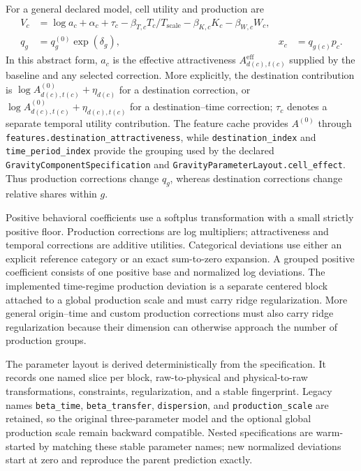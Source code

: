 For a general declared model, cell utility and production are
\[
\begin{aligned}
 V_c & = \log a_c + \alpha_c + \tau_c
       -\beta_{T,c}T_c/T_{\mathrm{scale}}
       -\beta_{K,c}K_c-\beta_{W,c}W_c,\\
 q_g & =q_g^{(0)}\exp(\delta_g),
 & x_c & =q_{g(c)}p_c.
\end{aligned}
\]
In this abstract form, $a_c$ is the effective attractiveness
$A^{\mathrm{eff}}_{d(c),t(c)}$ supplied by the baseline and any selected
correction.  More explicitly, the destination contribution is
$\log A^{(0)}_{d(c),t(c)}+\eta_{d(c)}$ for a destination correction, or
$\log A^{(0)}_{d(c),t(c)}+\eta_{d(c),t(c)}$ for a destination--time correction;
$\tau_c$ denotes a separate temporal utility contribution.  The feature cache
provides $A^{(0)}$ through
\texttt{features.destination\_attractiveness}, while
\texttt{destination\_index} and \texttt{time\_period\_index} provide the
grouping used by the declared
\texttt{GravityComponent\allowbreak{}Specification} and
\texttt{GravityParameter\allowbreak{}Layout.cell\_effect}.  Thus production corrections
change $q_g$, whereas destination corrections change relative shares within
$g$.

Positive behavioral coefficients use a softplus transformation with a small
strictly positive floor. Production corrections are log multipliers;
attractiveness and temporal corrections are additive utilities. Categorical
deviations use either an explicit reference category or an exact sum-to-zero
expansion. A grouped positive coefficient consists of one positive base and
normalized log deviations. The implemented time-regime production deviation
is a separate centered block attached to a global production scale and must
carry ridge regularization. More general origin--time and custom production
corrections must also carry ridge regularization because their dimension can
otherwise approach the number of production groups.

The parameter layout is derived deterministically from the specification. It
records one named slice per block, raw-to-physical and physical-to-raw
transformations, constraints, regularization, and a stable fingerprint.
Legacy names \texttt{beta\_time}, \texttt{beta\_transfer},
\texttt{dispersion}, and \texttt{production\_scale} are retained, so the
original three-parameter model and the optional global production scale remain
backward compatible. Nested specifications are warm-started by matching these
stable parameter names; new normalized deviations start at zero and reproduce
the parent prediction exactly.

